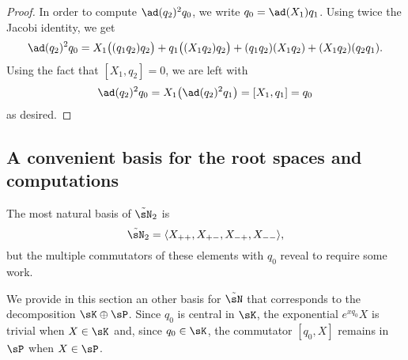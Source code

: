\begin{proof}
	In order to compute $\ad(q_2)^2q_0$, we write $q_0=\ad(X_1)q_1$. Using twice the Jacobi identity, we get
	\begin{equation}
		\ad(q_2)^2q_0=X_1\big( (q_1q_2)q_2 \big)+q_1\big( (X_1q_2)q_2 \big)+(q_1q_2)(X_1q_2)+(X_1q_2)(q_2q_1).
	\end{equation}
	Using the fact that $[X_1,q_2]=0$, we are left with
	\begin{equation}
		\ad(q_2)^2q_0=X_1\big( \ad(q_2)^2q_1 \big)=[X_1,q_1]=q_0
	\end{equation}
	as desired.
\end{proof}


%
\subsection{A convenient basis for the root spaces and computations}
%
\label{LONGSubSecMOreConvBasisBlbla}
%

The most natural basis of $\tilde\sN_2$ is
\begin{equation}
	\tilde\sN_2=\langle X_{++},X_{+-},X_{-+},X_{--}\rangle,
\end{equation}
but the multiple commutators of these elements with $q_0$ reveal to require some work. 

We provide in this section an other basis for $\tilde\sN$ that corresponds to the decomposition $\sK\oplus\sP$. Since $q_0$ is central in $\sK$, the exponential $e^{xq_0}X$ is trivial when $X\in\sK$ and, since $q_0\in\sK$, the commutator $[q_0,X]$ remains in $\sP$ when $X\in\sP$.

